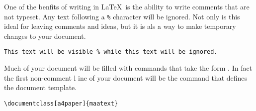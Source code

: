 One of the benfits of writing in \LaTeX\, is the ability to write comments
that are not typeset.  Any text following a \lstinline{%} character will be 
ignored.  Not only is this ideal for leaving comments and ideas, but it is 
als a way to make temporary changes to your document.
\lstset{style=mhotexcode}
\begin{lstlisting}[belowskip=-2 \baselineskip]
% This code will be ignored
This text will be visible % while this text will be ignored.
\end{lstlisting}
Much of your document will be filled with commands that take the form 
. In fact the first non-comment l
ine of your document will be the command that defines the document template.
\begin{lstlisting}
\documentclass[a4paper]{maatext}
\end{lstlisting}
